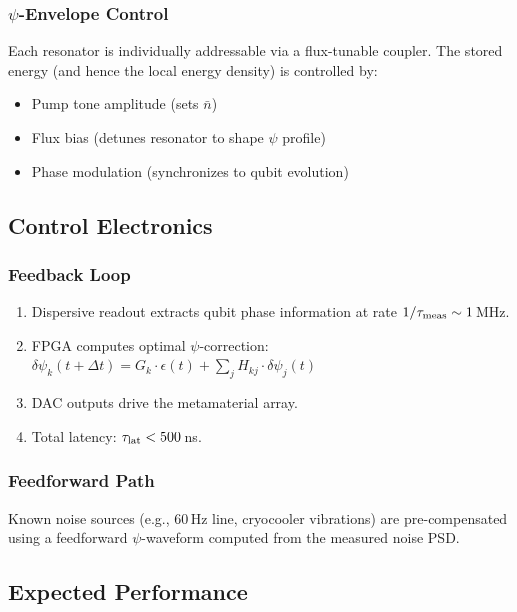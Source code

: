 \documentclass[aps,prd,twocolumn,superscriptaddress,nofootinbib]{revtex4-2}
\begin{document}
\subsubsection{$\psi$-Envelope Control}
Each resonator is individually addressable via a flux-tunable coupler.
The stored energy (and hence the local energy density) is controlled by:
\begin{itemize}
\item Pump tone amplitude (sets $\bar{n}$)
\item Flux bias (detunes resonator to shape $\psi$ profile)
\item Phase modulation (synchronizes to qubit evolution)
\end{itemize}

\subsection{Control Electronics}

\subsubsection{Feedback Loop}
\begin{enumerate}
\item Dispersive readout extracts qubit phase information at rate
$1/\tau_{\rm meas} \sim 1$\,MHz.
\item FPGA computes optimal $\psi$-correction:
$\delta\psi_k(t+\Delta t) = G_k \cdot \epsilon(t) + \sum_j H_{kj} \cdot
\delta\psi_j(t)$
\item DAC outputs drive the metamaterial array.
\item Total latency: $\tau_{\rm lat} < 500$\,ns.
\end{enumerate}

\subsubsection{Feedforward Path}
Known noise sources (e.g., 60\,Hz line, cryocooler vibrations) are
pre-compensated using a feedforward $\psi$-waveform computed from the
measured noise PSD.

\subsection{Expected Performance}
\end{document}
